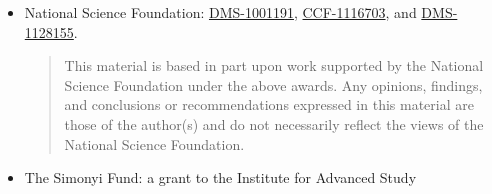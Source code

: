 {\begin{itemize}
\item National Science Foundation: 
  \href{http://www.nsf.gov/awardsearch/showAward.do?AwardNumber=1001191}{DMS-1001191}, %
  \href{http://www.nsf.gov/awardsearch/showAward.do?AwardNumber=1116703}{CCF-1116703}, %
  and 
  \href{http://www.nsf.gov/awardsearch/showAward.do?AwardNumber=1128155}{DMS-1128155}. %
  {
    \setlength{\itemsep}{0pt}
    \begin{quote}
      \noindent\scriptsize
      This material is based in part upon work supported by the
      National Science Foundation under the above awards.  Any opinions,
      findings, and conclusions or recommendations expressed in this
      material are those of the author(s) and do not necessarily reflect the
      views of the National Science Foundation.
    \end{quote}
  }
\item The Simonyi Fund: a grant to the Institute for Advanced Study          %
  \end{itemize}


}
\cleartooddpage

